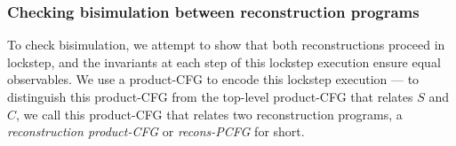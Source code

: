 \subsubsection{Checking bisimulation between reconstruction programs}
\label{sec:bisim}
To check bisimulation, we attempt to show that both reconstructions
proceed in lockstep, and the invariants at
each step of this lockstep execution ensure equal observables.
We use a product-CFG to encode this lockstep execution --- to distinguish this
product-CFG from the top-level product-CFG that relates $S$ and $C$, we call
this product-CFG that relates two reconstruction programs, a {\em reconstruction product-CFG}
or {\em recons-PCFG} for short.




